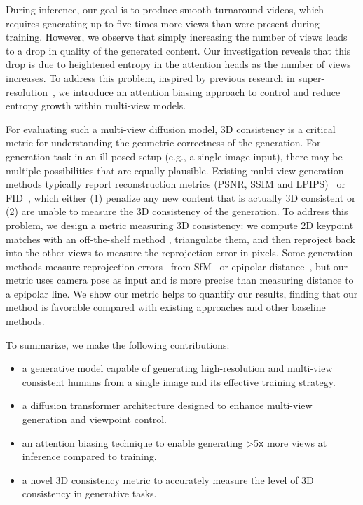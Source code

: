 During inference, our goal is to produce smooth turnaround videos, which requires generating up to five times more views than were present during training. However, we observe that simply increasing the number of views leads to a drop in quality of the generated content. Our investigation reveals that this drop is due to heightened entropy in the attention heads as the number of views increases. To address this problem, inspired by previous research in super-resolution~\cite{jin2023training}, we introduce an attention biasing approach to control and reduce entropy growth within multi-view models.

For evaluating such a multi-view diffusion model, 3D consistency is a critical metric for understanding the geometric correctness of the generation. 
For generation task in an ill-posed setup (e.g., a single image input), there may be multiple possibilities that are equally plausible. 
Existing multi-view generation methods typically report reconstruction metrics (\ie PSNR, SSIM and LPIPS)~\cite{gao2024cat3d} 
or FID~\cite{zero1to3}, which either (1) penalize any new content that is actually 3D consistent or 
(2) are unable to measure the 3D consistency of the generation. 
To address this problem, we design a metric measuring 3D consistency: we compute 2D keypoint matches
with an off-the-shelf method \cite{sarlin2020superglue}, triangulate them, and then reproject back into the other views to
measure the reprojection error in pixels.
Some generation methods measure reprojection errors~\cite{fridman2024scenescape} from SfM~\cite{SFM} or epipolar distance~\cite{muller2024multidiff,TrainNVSDM3}, but our metric uses camera pose as input and is more precise than measuring distance to a epipolar line. We show our metric helps to quantify our results, finding that our method is favorable compared with existing approaches and other baseline methods.


\noindent To summarize, we make the following contributions:
\begin{itemize}
    \item a generative model capable of generating high-resolution and multi-view consistent humans from a single image and its effective training strategy.
    \item a diffusion transformer architecture designed to enhance multi-view generation and viewpoint control.

    \item an attention biasing technique to enable generating >5\texttt{x} more views at inference compared to training.

    \item a novel 3D consistency metric to accurately measure the level of 3D consistency in generative tasks. 
\end{itemize}








